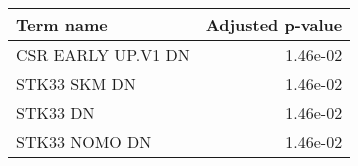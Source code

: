 \begin{tabular}{lr}
\toprule
         Term name &  Adjusted p-value \\
\midrule
CSR EARLY UP.V1 DN &          1.46e-02 \\
      STK33 SKM DN &          1.46e-02 \\
          STK33 DN &          1.46e-02 \\
     STK33 NOMO DN &          1.46e-02 \\
\bottomrule
\end{tabular}
